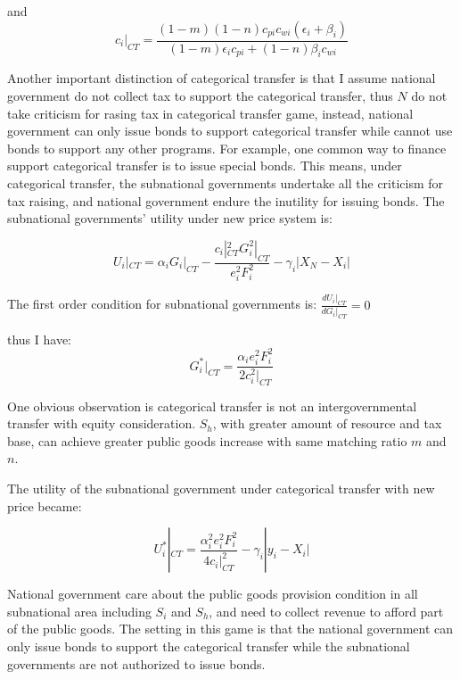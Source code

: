 \begin{itemize}
and
\begin{equation}
  c_i|_{CT}=\frac{(1-m)(1-n)c_{pi}c_{wi}(\epsilon_i+\beta_i)}{(1-m) \epsilon_i c_{pi}+(1-n)\beta_i c_{wi}}
\end{equation}

Another important distinction of categorical transfer is that I assume national government do not collect tax to support the categorical transfer, thus $N$ do not take criticism for rasing tax in categorical transfer game, instead, national government can only issue bonds to support categorical transfer while cannot use bonds to support any other programs. For example, one common way to finance support categorical transfer is to issue special bonds. This means, under categorical transfer, the subnational governments undertake all the criticism for tax raising, and national government endure the inutility for issuing bonds. The subnational governments' utility under new price system is:

$$U_i|_{CT}=\alpha_iG_i|_{CT}-\frac{c_i|_{CT}^2G_i^2|_{CT}}{e_i^2F_i^2}-\gamma_i|X_N-X_i|$$

The first order condition for subnational governments is:
$\frac{dU_i|_{CT}}{dG_i|_{CT}}=0$

thus I have:
\begin{equation}
  G_i^*|_{CT}=\frac{\alpha_i e_i^2 F_i^2}{2 c_i^2|_{CT}}
\end{equation}

One obvious observation is categorical transfer is not an intergovernmental transfer with equity consideration. $S_h$, with greater amount of resource and tax base, can achieve greater public goods increase with same matching ratio $m$ and $n$.

The utility of the subnational government under categorical transfer with new price became:

\begin{equation}
  U_i^*|_{CT}=\frac{\alpha_i^2 e_i^2 F_i^2}{4c_i|_{CT}^2}-\gamma_i|y_i-X_i|
\end{equation}

National government care about the public goods provision condition in all subnational area including $S_i$ and $S_h$, and need to collect revenue to afford part of the public goods. The setting in this game is that the national government can only issue bonds to support the categorical transfer while the subnational governments are not authorized to issue bonds.


\end{itemize}
